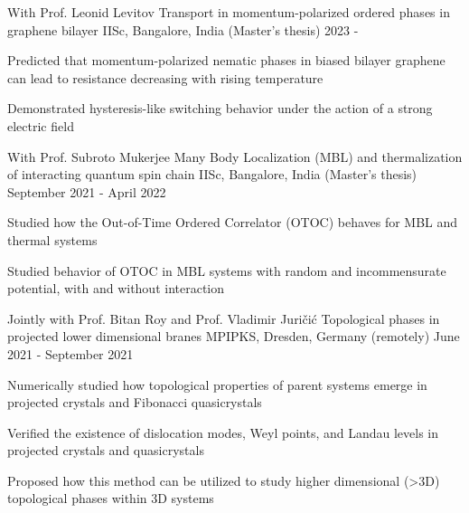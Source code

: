 

\begin{cventries}

\cventry
{With Prof. Leonid Levitov} %
{Transport in momentum-polarized ordered phases in graphene bilayer} %
{IISc, Bangalore, India \space \space\space\space\space\space\space\space\space\space\space\space\space(Master's thesis)} %
{2023 - } %
{
	\begin{cvitems} %
		\item{Predicted that momentum-polarized nematic phases in biased bilayer graphene can lead to resistance decreasing with rising temperature}
		\item{Demonstrated hysteresis-like switching behavior under the action of a strong electric field}
	\end{cvitems}
}

\cventry
{With Prof. Subroto Mukerjee} %
{Many Body Localization (MBL) and thermalization of interacting quantum spin chain} %
{IISc, Bangalore, India \space \space\space\space\space\space\space\space\space\space\space\space\space(Master's thesis)} %
{September 2021 - April 2022} %
	{
		\begin{cvitems} %
			\item{Studied how the Out-of-Time Ordered Correlator (OTOC) behaves for MBL and thermal systems}
			\item{Studied behavior of OTOC in MBL systems with random and incommensurate potential, with and without interaction}
		\end{cvitems}
	}


\cventry
{Jointly with Prof. Bitan Roy and Prof. Vladimir Juri\v{c}i\'c} %
{Topological phases in projected lower dimensional branes} %
{MPIPKS, Dresden, Germany (remotely)} %
{June 2021 - September 2021} %
{
	\begin{cvitems} %
		\item {Numerically studied how topological properties of parent systems emerge in projected crystals and Fibonacci quasicrystals}
		\item {Verified the existence of dislocation modes, Weyl points, and Landau levels in projected crystals and quasicrystals}
		\item {Proposed how this method can be utilized to study higher dimensional (>3D) topological phases within 3D systems}
	\end{cvitems}
}


\end{cventries}
